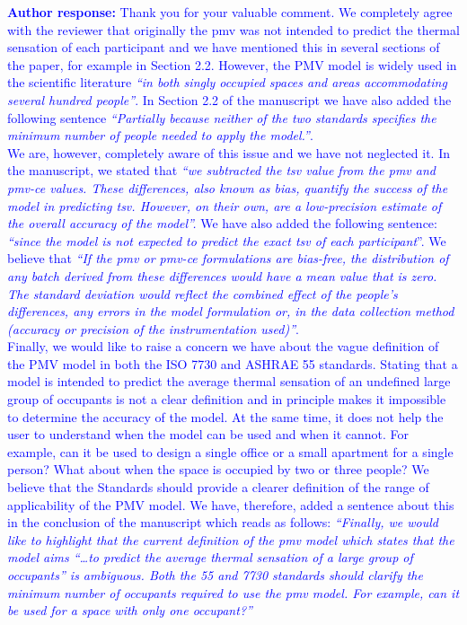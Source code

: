 \documentclass[a4paper, 10pt]{letter}
\newcommand{\response}[1]{\textcolor{blue}{\textbf{Author response:} #1}}
\begin{document}
\begin{letter}
\begin{enumerate}
            \response{
                Thank you for your valuable comment.
                We completely agree with the reviewer that originally the \ac{pmv} was not intended to predict the thermal sensation of each participant and we have mentioned this in several sections of the paper, for example in Section 2.2.
                However, the PMV model is widely used in the scientific literature \textit{``in both singly occupied spaces and areas accommodating several hundred people''}.
                In Section 2.2 of the manuscript we have also added the following sentence \textit{``Partially because neither of the two standards specifies the minimum number of people needed to apply the model.''}.\\
                We are, however, completely aware of this issue and we have not neglected it.
                In the manuscript, we stated that \textit{``we subtracted the \ac{tsv} value from the \ac{pmv} and \ac{pmv-ce} values.
                These differences, also known as bias, quantify the success of the model in predicting \ac{tsv}.
                However, on their own, are a low-precision estimate of the overall accuracy of the model''.}
                We have also added the following sentence: \textit{``since the model is not expected to predict the exact \ac{tsv} of each participant}''.
                We believe that \textit{``If the \ac{pmv} or \ac{pmv-ce} formulations are bias-free, the distribution of any batch derived from these differences would have a mean value that is zero.
                The standard deviation would reflect the combined effect of the people's differences, any errors in the model formulation or, in the data collection method (accuracy or precision of the instrumentation used)''}.\\
                Finally, we would like to raise a concern we have about the vague definition of the PMV model in both the ISO 7730 and ASHRAE 55 standards.
                Stating that a model is intended to predict the average thermal sensation of an undefined large group of occupants is not a clear definition and in principle makes it impossible to determine the accuracy of the model.
                At the same time, it does not help the user to understand when the model can be used and when it cannot.
                For example, can it be used to design a single office or a small apartment for a single person?
                What about when the space is occupied by two or three people?
                We believe that the Standards should provide a clearer definition of the range of applicability of the PMV model.
                We have, therefore, added a sentence about this in the conclusion of the manuscript which reads as follows: \textit{``Finally, we would like to highlight that the current definition of the \ac{pmv} model which states that the model aims ``\ldots to predict the average thermal sensation of a large group of occupants'' is ambiguous.
                Both the \gls{55} and \gls{7730} standards should clarify the minimum number of occupants required to use the \ac{pmv} model.
                For example, can it be used for a space with only one occupant?''}
            }


\end{enumerate}
\end{letter}
\end{document}
